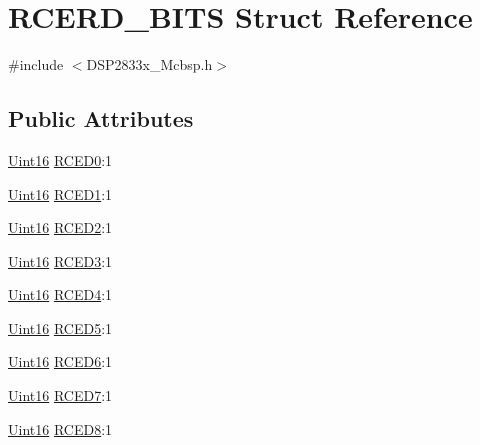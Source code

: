\hypertarget{struct_r_c_e_r_d___b_i_t_s}{}\section{R\+C\+E\+R\+D\+\_\+\+B\+I\+T\+S Struct Reference}
\label{struct_r_c_e_r_d___b_i_t_s}


{\ttfamily \#include $<$D\+S\+P2833x\+\_\+\+Mcbsp.\+h$>$}

\subsection*{Public Attributes}
\begin{DoxyCompactItemize}
\item 
\hyperlink{_d_s_p2833x___device_8h_a59a9f6be4562c327cbfb4f7e8e18f08b}{Uint16} \hyperlink{struct_r_c_e_r_d___b_i_t_s_a66f286b379bd7e100cd55ab6f83ec9d2}{R\+C\+E\+D0}\+:1
\item 
\hyperlink{_d_s_p2833x___device_8h_a59a9f6be4562c327cbfb4f7e8e18f08b}{Uint16} \hyperlink{struct_r_c_e_r_d___b_i_t_s_a02b411bb78f0d84f5d2c897b244a068d}{R\+C\+E\+D1}\+:1
\item 
\hyperlink{_d_s_p2833x___device_8h_a59a9f6be4562c327cbfb4f7e8e18f08b}{Uint16} \hyperlink{struct_r_c_e_r_d___b_i_t_s_a8a031a9b2a9c7eb67962236af53ed694}{R\+C\+E\+D2}\+:1
\item 
\hyperlink{_d_s_p2833x___device_8h_a59a9f6be4562c327cbfb4f7e8e18f08b}{Uint16} \hyperlink{struct_r_c_e_r_d___b_i_t_s_a6701718719f4924cebc573d7bb6ada08}{R\+C\+E\+D3}\+:1
\item 
\hyperlink{_d_s_p2833x___device_8h_a59a9f6be4562c327cbfb4f7e8e18f08b}{Uint16} \hyperlink{struct_r_c_e_r_d___b_i_t_s_a8cdb7a3defb11cd79ca88820c79f641f}{R\+C\+E\+D4}\+:1
\item 
\hyperlink{_d_s_p2833x___device_8h_a59a9f6be4562c327cbfb4f7e8e18f08b}{Uint16} \hyperlink{struct_r_c_e_r_d___b_i_t_s_a63e8cadc8dd5c92d80a94c4044162ec7}{R\+C\+E\+D5}\+:1
\item 
\hyperlink{_d_s_p2833x___device_8h_a59a9f6be4562c327cbfb4f7e8e18f08b}{Uint16} \hyperlink{struct_r_c_e_r_d___b_i_t_s_aaed562bef6f2121d1a49182145eac78e}{R\+C\+E\+D6}\+:1
\item 
\hyperlink{_d_s_p2833x___device_8h_a59a9f6be4562c327cbfb4f7e8e18f08b}{Uint16} \hyperlink{struct_r_c_e_r_d___b_i_t_s_a14c68ccb4606f307a6eadd3628f104c1}{R\+C\+E\+D7}\+:1
\item 
\hyperlink{_d_s_p2833x___device_8h_a59a9f6be4562c327cbfb4f7e8e18f08b}{Uint16} \hyperlink{struct_r_c_e_r_d___b_i_t_s_a11c5f9e2f5434adfe34756195759ee19}{R\+C\+E\+D8}\+:1

\end{DoxyCompactItemize}
